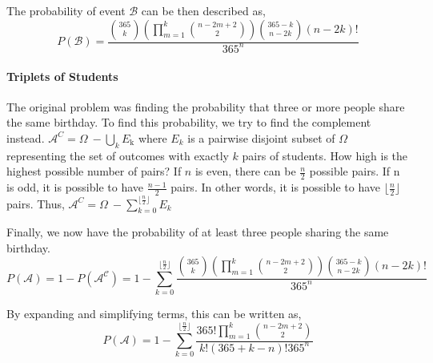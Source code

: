 \documentclass[12pt, letterpaper]{book}
\begin{document}
	The probability of event \(\mathcal{B}\) can be then described as,
	\begin{equation}
		P\left(\mathcal{B}\right)=\frac{\binom{365}{k}\left(\prod_{m=1}^{k}{\binom{n-2m+2}{2}}\right)\binom{365-k}{n-2k}\left(n-2k\right)!}{365^n}
	\end{equation}
	\paragraph{Triplets of Students}
	The original problem was finding the probability that three or more people share the same birthday. To find this probability, we try to find the complement instead.  \(\mathcal{A}^C = \Omega\ - \bigcup_{k}{E_{\text{k}}}\) where \(E_k\) is a pairwise disjoint subset of \(\Omega\) representing the set of outcomes with exactly \(k\) pairs of students.
	How high is the highest possible number of pairs? If \(n\) is even, there can be \(\frac{n}{2}\) possible pairs. If n is odd, it is possible to have \(\frac{n-1}{2}\) pairs. In other words, it is possible to have \(\lfloor{\frac{n}{2}}\rfloor\) pairs. Thus, \(\mathcal{A}^C = \Omega\ - \sum_{k=0}^{\lfloor{\frac{n}{2}}\rfloor}{E_k}\)
	
	Finally, we now have the probability of at least three people sharing the same birthday.
	\begin{equation}
		P\left(\mathcal{A}\right)= 1 - P\left(\mathcal{A^C}\right)=1- \sum_{k=0}^{\lfloor{\frac{n}{2}}\rfloor}{\frac{\binom{365}{k}\left(\prod_{m=1}^{k}{\binom{n-2m+2}{2}}\right)\binom{365-k}{n-2k}\left(n-2k\right)!}{365^n}}
	\end{equation}

	By expanding and simplifying terms, this can be written as,
	\begin{equation}
		P(\mathcal{A}) = 1 - \sum_{k=0}^{\lfloor \frac{n}{2} \rfloor} \frac{365! \prod_{m=1}^k{\binom{n-2m+2}{2}}}{k! (365+k-n)!365^n}
	\end{equation}
\end{document}
